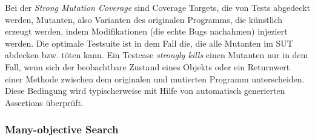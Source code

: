 \documentclass{article}
\begin{document}
Bei der \textit{Strong Mutation Coverage} sind Coverage Targets, die von Tests abgedeckt werden, Mutanten, also Varianten des originalen Programms, die künstlich erzeugt werden, indem Modifikationen (die echte Bugs nachahmen) injeziert werden. Die optimale Testsuite ist in dem Fall die, die alle Mutanten im \ac{SUT} abdecken bzw. töten kann. Ein Testcase \textit{strongly kills} einen Mutanten nur in dem Fall, wenn sich der beobachtbare Zustand eines Objekts oder ein Returnwert einer Methode zwischen dem originalen und mutierten Programm unterscheiden. Diese Bedingung wird typischerweise mit Hilfe von automatisch generierten Assertions überprüft.


\subsubsection{Many-objective Search}
\end{document}

